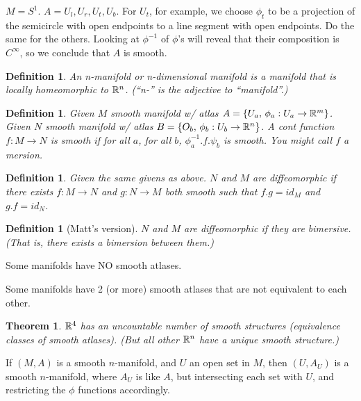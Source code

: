\documentclass[11pt,leqno,oneside]{amsart}
\newcommand{\de}{\emph}
\theoremstyle{mystyle} \newtheorem{thrm}[thm]{Theorem}
\theoremstyle{mystyle} \newtheorem{defi}[thm]{Definition}
\begin{document}
\begin{example}
	$M = S^1$.  $A = {U_l, U_r, U_t, U_b}$.  For $U_t$, for example, we choose $\phi_t$ to be a projection of the semicircle with open endpoints to a line segment with open endpoints.  Do the same for the others.  Looking at $\phi^{-1}$ of $\phi$'s will reveal that their composition is $C^\infty$, so we conclude that $A$ is smooth.
\end{example}

\begin{defi}
	An \de{n-}manifold or \de{n-dimensional} manifold is a manifold that is locally homeomorphic to ${\mathbb R}^n$.  (``n-'' is the adjective to ``manifold''.)
\end{defi}


\begin{defi}
	Given $M$ smooth manifold w/ atlas $A = \{ U_a, \,  \phi_a : U_a \to {\mathbb R}^m \}$.
	Given $N$ smooth manifold w/ atlas $B = \{ O_b, \,  \phi_b : U_b \to {\mathbb R}^n \}$.
	A cont function $f : M \to N$ is \de{smooth} if for all $a$, for all $b$, $\phi_a^{-1}.f.\psi_b$ is smooth.  You might call $f$ a \de{mersion}.
\end{defi}
\begin{defi}
	Given the same givens as above.
	$N$ and $M$ are \de{diffeomorphic} if there exists $f : M \to N$ and $g : N \to M$ both smooth such that $f.g = id_M$ and $g.f = id_N$.
\end{defi}
\begin{defi}[Matt's version]
	$N$ and $M$ are \de{diffeomorphic} if they are bimersive.  (That is, there exists a bimersion between them.)
\end{defi}

\begin{rmk}
	Some manifolds have NO smooth atlases.

	Some manifolds have 2 (or more) smooth atlases that are not equivalent to each other.
\end{rmk}


\begin{thrm}
	${\mathbb R}^4$ has an uncountable number of smooth structures (equivalence classes of smooth atlases).  (But all other ${\mathbb R}^n$ have a unique smooth structure.)
\end{thrm}

\begin{rmk}
	If $(M,A)$ is a smooth $n$-manifold, and $U$ an open set in $M$, then $(U,A_U)$ is a smooth $n$-manifold, where $A_U$ is like $A$, but intersecting each set with $U$, and restricting the $\phi$ functions accordingly.
\end{rmk}
\end{document}
